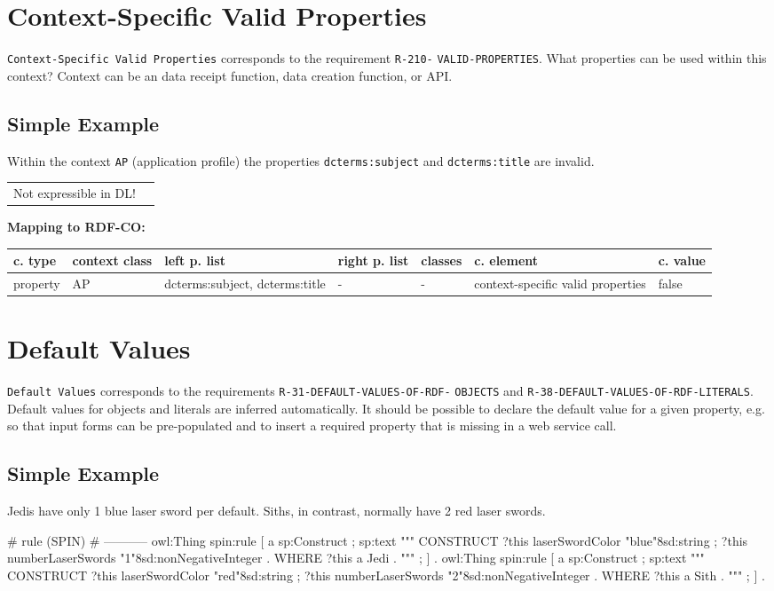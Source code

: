 \documentclass{llncs}
\newcommand{\ms}[1]{\texttt{#1}}
\newenvironment{gcotable}{
  \scriptsize
  \sffamily
  \vspace{0cm}
	\begin{center}
	\textbf{\vspace{0.4cm}Mapping to RDF-CO:} \\
  \begin{tabular}{l|l|l|l|l|l|l}
	\hline
  \textbf{c. type} & \textbf{context class} & \textbf{left p. list} & \textbf{right p. list} & \textbf{classes} & \textbf{c. element} & \textbf{c. value} \\
  \hline

}{
  \hline
  \end{tabular}
	\end{center}
}
\newenvironment{DL}{
  \vspace{0cm}
	\begin{center}
  \begin{tabular}{r l}

}{
  \end{tabular}
	\end{center}
}
\begin{document}
\section{Context-Specific Valid Properties}

\ms{Context-Specific Valid Properties} corresponds to the requirement
\ms{R-210-} \ms{VALID-PROPERTIES}.
What properties can be used within this context? 
Context can be an data receipt function, data creation function, or API.

\subsection{Simple Example}

Within the context \ms{AP} (application profile) the properties \ms{dcterms:subject} and \ms{dcterms:title} are invalid.

\begin{DL}
Not expressible in DL!
\end{DL}

\begin{gcotable}
property & AP & dcterms:subject, dcterms:title & - & - & context-specific valid properties & false \\
\end{gcotable}

\section{Default Values}

\ms{Default Values} corresponds to the requirements
\ms{R-31-DEFAULT-VALUES-OF-RDF-} \ms{OBJECTS} and
\ms{R-38-DEFAULT-VALUES-OF-RDF-LITERALS}.
Default values for objects and literals are inferred automatically.
It should be possible to declare the default value for a given property, e.g. so that input forms can be pre-populated and to insert a required property that is missing in a web service call. 

\subsection{Simple Example}

Jedis have only 1 blue laser sword per default.
Siths, in contrast, normally have 2 red laser swords.

\begin{ex}
# rule (SPIN)
# -----------
owl:Thing
    spin:rule [
        a sp:Construct ;
            sp:text """
                CONSTRUCT {            
                    ?this laserSwordColor "blue"^^xsd:string ;
                    ?this numberLaserSwords "1"^^xsd:nonNegativeInteger . 
                }
                WHERE {             
                    ?this a Jedi .            
                } """ ; ] .
owl:Thing
    spin:rule [
        a sp:Construct ;
            sp:text """
                CONSTRUCT {
                    ?this laserSwordColor "red"^^xsd:string ;
                    ?this numberLaserSwords "2"^^xsd:nonNegativeInteger . 
                }
                WHERE {             
                    ?this a Sith .            
                } """ ; ] .
\end{ex}
\end{document}
